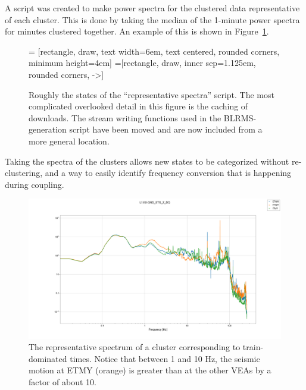 \documentclass[colorlinks=true,pdfstartview=FitV,linkcolor=blue,
            citecolor=red,urlcolor=magenta]{ligodoc}
\begin{document}
A script was created to make power spectra for the clustered data representative of each cluster.
This is done by taking the median of the 1-minute power spectra for minutes clustered together.
An example of this is shown in Figure~\ref{fig:reps}.
\begin{figure}[h]
   = [rectangle, draw, text width=6em, text centered, rounded corners, minimum height=4em]
   =[rectangle, draw, inner sep=1.125em, rounded corners, ->]
  \caption{Roughly the states of the ``representative spectra'' script. The most complicated overlooked detail in this figure is the caching of downloads. The stream writing functions used in the BLRMS-generation script have been moved and are now included from a more general location.}
\end{figure}

Taking the spectra of the clusters allows new states to be categorized without re-clustering, and a way to easily identify frequency conversion that is happening during coupling.

\begin{figure}
  \includegraphics[width=\textwidth]{assets/report2/0-L1:ISI-GND_STS_Z_DQ.png}
  \caption{The representative spectrum of a cluster corresponding to train-dominated times. Notice that between 1 and 10 Hz, the seismic motion at ETMY (orange) is greater than at the other VEAs by a factor of about 10.}\label{fig:reps}
\end{figure}
\end{document}
